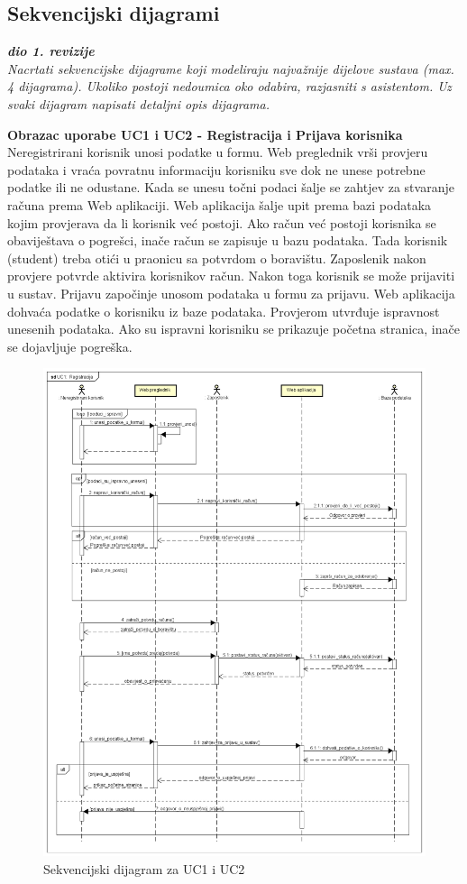 \subsection{Sekvencijski dijagrami}

\textbf{\textit{dio 1. revizije}}\\

\textit{Nacrtati sekvencijske dijagrame koji modeliraju najvažnije dijelove sustava (max. 4 dijagrama). Ukoliko postoji nedoumica oko odabira, razjasniti s asistentom. Uz svaki dijagram napisati detaljni opis dijagrama.}
\eject

\textbf{Obrazac uporabe UC1 i UC2 - Registracija i Prijava korisnika}\\

Neregistrirani korisnik unosi podatke u formu. Web preglednik vrši provjeru podataka i vraća povratnu informaciju korisniku sve dok ne unese potrebne podatke ili ne odustane. Kada se unesu točni podaci šalje se zahtjev za stvaranje računa prema Web aplikaciji. Web aplikacija šalje upit prema bazi podataka kojim provjerava da li korisnik već postoji. Ako račun već postoji korisnika se obaviještava o pogrešci, inače račun se zapisuje u bazu podataka. Tada korisnik (student) treba otići u praonicu sa potvrdom o boravištu. Zaposlenik nakon provjere potvrde aktivira korisnikov račun. Nakon toga korisnik se može prijaviti u sustav. Prijavu započinje unosom podataka u formu za prijavu. Web aplikacija dohvaća podatke o korisniku iz baze podataka. Provjerom utvrđuje ispravnost unesenih podataka. Ako su ispravni korisniku se prikazuje početna stranica, inače se dojavljuje pogreška.


\begin{figure}[H]
	\includegraphics[width=.9\linewidth]{slike/UC1_Registracija.png}
	\centering
	\caption{Sekvencijski dijagram za UC1 i UC2}
	\label{fig:skvDReg}
\end{figure}
\eject

